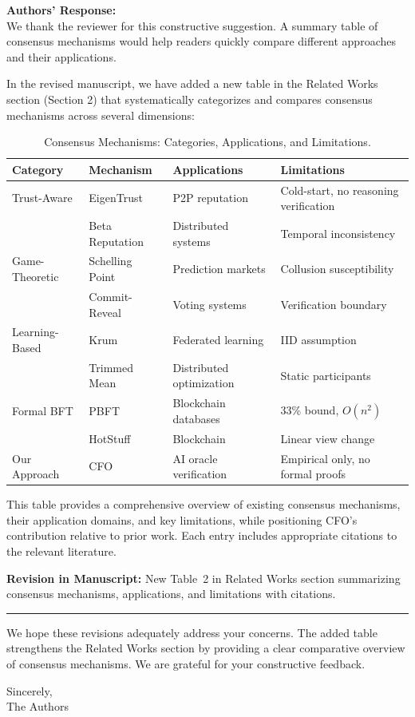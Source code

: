 \documentclass[11pt,a4paper]{article}
\newcommand{\response}[1]{%
  \noindent\textbf{\textcolor{responsecolor}{Authors' Response:}}\\
  #1\vspace{8pt}}
\newcommand{\revision}[1]{%
  \noindent\textbf{Revision in Manuscript:} #1\vspace{4pt}}
\begin{document}
\response{We thank the reviewer for this constructive suggestion. A summary table of consensus mechanisms would help readers quickly compare different approaches and their applications.

In the revised manuscript, we have added a new table in the Related Works section (Section 2) that systematically categorizes and compares consensus mechanisms across several dimensions:

\begin{table}[h]
\caption{Consensus Mechanisms: Categories, Applications, and Limitations.}
\label{tab:consensus_mechanisms}
\centering
\begin{tabular}{l l l l}
\toprule
\textbf{Category} & \textbf{Mechanism} & \textbf{Applications} & \textbf{Limitations} \\
\midrule
Trust-Aware & EigenTrust & P2P reputation & Cold-start, no reasoning verification \\
 & Beta Reputation & Distributed systems & Temporal inconsistency \\
\midrule
Game-Theoretic & Schelling Point & Prediction markets & Collusion susceptibility \\
 & Commit-Reveal & Voting systems & Verification boundary \\
\midrule
Learning-Based & Krum & Federated learning & IID assumption \\
 & Trimmed Mean & Distributed optimization & Static participants \\
\midrule
Formal BFT & PBFT & Blockchain databases & 33\% bound, $O(n^2)$ \\
 & HotStuff & Blockchain & Linear view change \\
\midrule
Our Approach & CFO & AI oracle verification & Empirical only, no formal proofs \\
\bottomrule
\end{tabular}
\end{table}

This table provides a comprehensive overview of existing consensus mechanisms, their application domains, and key limitations, while positioning CFO's contribution relative to prior work. Each entry includes appropriate citations to the relevant literature.}

\revision{New Table~2 in Related Works section summarizing consensus mechanisms, applications, and limitations with citations.}

\vspace{12pt}
\noindent\rule{\textwidth}{0.4pt}
\vspace{6pt}

\noindent We hope these revisions adequately address your concerns. The added table strengthens the Related Works section by providing a clear comparative overview of consensus mechanisms. We are grateful for your constructive feedback.

\vspace{12pt}
\noindent Sincerely,\\
The Authors
\end{document}
